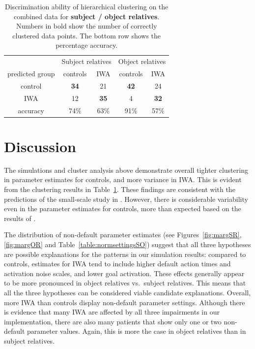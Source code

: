 \documentclass{cambridge7A}\usepackage[]{graphicx}\usepackage[]{color}
\begin{document}
\begin{table}
\begin{tabular}{ccccc}
 &\multicolumn{2}{c}{Subject relatives} & \multicolumn{2}{c}{Object relatives}\\
predicted group &    controls &  IWA & controls & IWA \\ 
         control      &  \textbf{34}             & 21   &        \textbf{42}   & 24\\
         IWA           & 12              & \textbf{35}    &         4    & \textbf{32}\\ 
 \hline        
         accuracy & 74\% & 63\% & 91\% & 57\%
\end{tabular}
\caption{Discrimination ability of hierarchical clustering on the combined data for \textbf{subject / object relatives}. Numbers in bold show the number of correctly clustered data points. The bottom row shows the percentage accuracy.}
  \label{table:hclustSO}
\end{table}


\section{Discussion}

The simulations and cluster analysis above demonstrate overall tighter clustering in parameter estimates for controls, and more variance in IWA. This is evident from the clustering results in Table~\ref{table:hclustSO}.
These findings are consistent with the predictions of the small-scale study in \cite{PatilEtAl2016}. However, there is considerable variability even in the parameter estimates for controls, more than expected based on the results of \cite{PatilEtAl2016}.

The distribution of non-default parameter estimates (see Figures~\ref{fig:margSR}, \ref{fig:margOR} and Table~\ref{table:normsettingsSO})
suggest that all three hypotheses are possible explanations for the patterns in our simulation results: compared to controls, estimates for IWA tend to include higher default action times and activation noise scales, and lower goal activation. These effects generally appear to be more pronounced in object relatives vs.\ subject relatives. This means that all the three hypotheses can be considered viable candidate explanations. 
Overall, more IWA than controls display non-default parameter settings. Although there is evidence that many IWA are affected by all three impairments in our implementation, there are also many patients that show only one or two non-default parameter values. Again, this is more the case in object relatives than in subject relatives.
\end{document}
